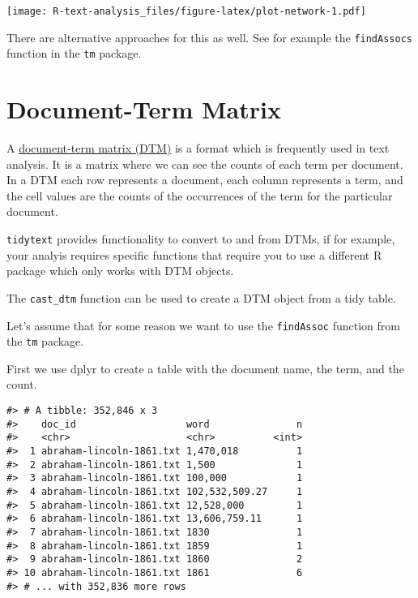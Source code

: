 \documentclass[]{book}
\newenvironment{Shaded}{\begin{snugshade}}{\end{snugshade}}
\newcommand{\CommentTok}[1]{\textcolor[rgb]{0.56,0.35,0.01}{\textit{#1}}}
\newcommand{\KeywordTok}[1]{\textcolor[rgb]{0.13,0.29,0.53}{\textbf{#1}}}
\newcommand{\NormalTok}[1]{#1}
\newcommand{\OperatorTok}[1]{\textcolor[rgb]{0.81,0.36,0.00}{\textbf{#1}}}
\newcommand{\StringTok}[1]{\textcolor[rgb]{0.31,0.60,0.02}{#1}}
\begin{document}
\texttt{[image: R-text-analysis\_files/figure-latex/plot-network-1.pdf]}

There are alternative approaches for this as well. See for example the \texttt{findAssocs} function in the \texttt{tm} package.

\hypertarget{document-term-matrix}{%
\section{Document-Term Matrix}\label{document-term-matrix}}

A \href{https://en.wikipedia.org/wiki/Document-term_matrix}{document-term matrix (DTM)} is a format which is frequently used in text analysis. It is a matrix where we can see the counts of each term per document. In a DTM each row represents a document, each column represents a term, and the cell values are the counts of the occurrences of the term for the particular document.

\texttt{tidytext} provides functionality to convert to and from DTMs, if for example, your analyis requires specific functions that require you to use a different R package which only works with DTM objects.

The \texttt{cast\_dtm} function can be used to create a DTM object from a tidy table.

Let's assume that for some reason we want to use the \texttt{findAssoc} function from the \texttt{tm} package.

First we use dplyr to create a table with the document name, the term, and the count.

\begin{Shaded}
\end{Shaded}

\begin{verbatim}
#> # A tibble: 352,846 x 3
#>    doc_id                   word               n
#>    <chr>                    <chr>          <int>
#>  1 abraham-lincoln-1861.txt 1,470,018          1
#>  2 abraham-lincoln-1861.txt 1,500              1
#>  3 abraham-lincoln-1861.txt 100,000            1
#>  4 abraham-lincoln-1861.txt 102,532,509.27     1
#>  5 abraham-lincoln-1861.txt 12,528,000         1
#>  6 abraham-lincoln-1861.txt 13,606,759.11      1
#>  7 abraham-lincoln-1861.txt 1830               1
#>  8 abraham-lincoln-1861.txt 1859               1
#>  9 abraham-lincoln-1861.txt 1860               2
#> 10 abraham-lincoln-1861.txt 1861               6
#> # ... with 352,836 more rows
\end{verbatim}
\end{document}
